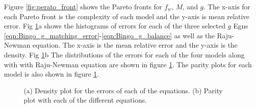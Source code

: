 Figure \ref{fig:perato_front} shows the Pareto fronts for $f_w$, $M$, and $g$. The x-axis for each Pareto front is the complexity of each model and the y-axis is mean relative error. Fig \ref{fig:error_plots}a shows the histograms of errors for each of the three selected $g$ Egns \ref{eqn:Bingo_g_matching_error}-\ref{eqn:Bingo_g_balance} as well as the Raju-Newman equation. The x-axis is the mean relative error and the y-axis is the density. Fig \ref{fig:error_plots}b
 The distributions of the errors for each of the four models along with with Raju-Newman equation are shown in figure \ref{fig:error_plots}. The parity plots for each model is also shown in figure \ref{fig:error_plots}.
\begin{figure}%
    \centering
    \qquad
    \caption{(a) Density plot for the errors of each of the equations. (b) Parity plot with each of the different equations.}%
    \label{fig:error_plots}%
\end{figure}

